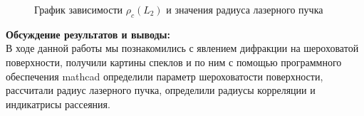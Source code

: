 \documentclass[a4paper, 12pt]{article}%
\begin{document}
\begin{enumerate}
\begin{longtable}{|c|c|c|c|c|}
		
	\end{longtable}
	
		\begin{figure}[H]
			\caption{График зависимости $\rho_c(L_2)$ и значения радиуса лазерного пучка}
		\end{figure}
	
	\end{enumerate}
	
	

	
	\textbf{Обсуждение результатов и выводы: }\\
	
	В ходе данной работы мы познакомились с явлением дифракции на шероховатой поверхности, получили картины спеклов и по ним с помощью программного обеспечения mathcad определили параметр шероховатости поверхности, рассчитали радиус лазерного пучка, определили радиусы корреляции и индикатрисы рассеяния.
	
	
	
	
	
	
	
	
	
	
	
	
	
	
	
	
	
	
	
	
	
	
	
	
	
	
	
	
\end{document}
